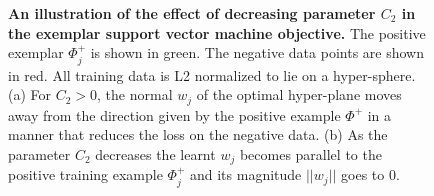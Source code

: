 \documentclass[10pt,twocolumn,letterpaper]{article}
\begin{document}
      \begin{figure}[t]
         \begin{center}
            \caption{
               {\bf An illustration of the effect of decreasing parameter $C_2$ in the exemplar support vector machine objective.} 
               The positive exemplar $\Phi_j^+$ is shown in green. The negative data points are shown in red. All training data is L2 normalized to lie on a hyper-sphere. (a) For $C_2>0$, the normal $w_j$ of the optimal hyper-plane moves away from the direction given by the positive example $\Phi^+$ in a manner that reduces the loss on the negative data.  (b) As the parameter $C_2$ decreases the learnt $w_j$ becomes parallel to the positive training example $\Phi_j^+$ and its magnitude $||w_j||$ goes to 0.
            }
            \label{fig:C2effect}
         \end{center}
      \end{figure}
\end{document}
